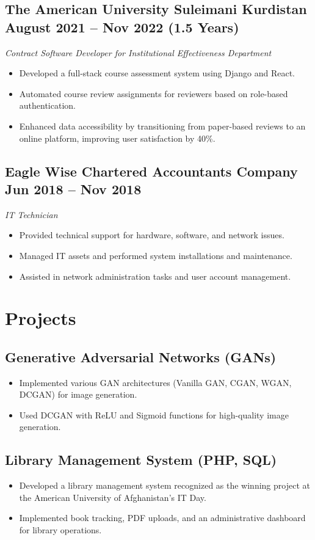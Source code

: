 \documentclass[a4paper,10pt]{article}
\begin{document}
\subsection*{The American University Suleimani Kurdistan \hfill August 2021 – Nov 2022 (1.5 Years)}
\textit{Contract Software Developer for Institutional Effectiveness Department}
\begin{itemize}
    \item Developed a full-stack course assessment system using Django and React.
    \item Automated course review assignments for reviewers based on role-based authentication.
    \item Enhanced data accessibility by transitioning from paper-based reviews to an online platform, improving user satisfaction by 40\%.
\end{itemize}

\subsection*{Eagle Wise Chartered Accountants Company \hfill Jun 2018 – Nov 2018}
\textit{IT Technician}
\begin{itemize}
    \item Provided technical support for hardware, software, and network issues.
    \item Managed IT assets and performed system installations and maintenance.
    \item Assisted in network administration tasks and user account management.
\end{itemize}

\section{Projects}
\subsection*{Generative Adversarial Networks (GANs)}
\begin{itemize}
    \item Implemented various GAN architectures (Vanilla GAN, CGAN, WGAN, DCGAN) for image generation.
    \item Used DCGAN with ReLU and Sigmoid functions for high-quality image generation.
\end{itemize}

\subsection*{Library Management System (PHP, SQL)}
\begin{itemize}
    \item Developed a library management system recognized as the winning project at the American University of Afghanistan's IT Day.
    \item Implemented book tracking, PDF uploads, and an administrative dashboard for library operations.
\end{itemize}
\end{document}

